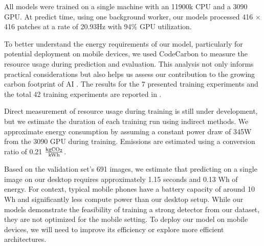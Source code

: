 All models were trained on a single machine with an 11900k CPU and a 3090 GPU.
At predict time, using one background worker, our models processed 416 $\times$ 416 patches at a rate of
  20.93Hz with 94\% GPU utilization.

To better understand the energy requirements of our model, particularly for potential deployment on mobile
  devices, we used CodeCarbon \cite{lacoste2019codecarbon} to measure the resource usage during prediction and
  evaluation.
This analysis not only informs practical considerations but also helps us assess our contribution to the
  growing carbon footprint of AI \cite{kirkpatrick_carbon_2023}.
The results for the 7 presented training experiments and the total 42 training experiments are reported in
  .

Direct measurement of resource usage during training is still under development, but we estimate the
  duration of each training run using indirect methods.
We approximate energy consumption by assuming a constant power draw of 345W from the 3090 GPU during
  training.
Emissions are estimated using a conversion ratio of 0.21 $\frac{\textrm{kg}\mathrm{CO_2}{}}{\textrm{kWh}}$.
  
Based on the validation set's 691 images, we estimate that predicting on a single image on our desktop
  requires approximately 1.15 seconds and 0.13 Wh of energy.
For context, typical mobile phones have a battery capacity of around 10 Wh and significantly less compute
  power than our desktop setup.
While our models demonstrate the feasibility of training a strong detector from our dataset, they are not
  optimized for the mobile setting.
To deploy our model on mobile devices, we will need to improve its efficiency or explore more efficient
  architectures.
